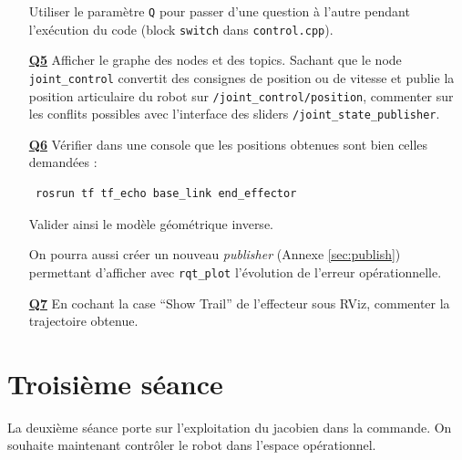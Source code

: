 \documentclass[12pt,a4paper]{article}
\begin{document}
\begin{itemize}
 Utiliser le paramètre \texttt{Q} pour passer d'une question à l'autre pendant l'exécution du code (block \texttt{switch} dans \texttt{control.cpp}).
 
  \medskip\item[\textbf{\underline{Q5}}] Afficher le graphe des nodes et des topics. Sachant que le node \texttt{joint\_control} convertit des consignes de position ou de vitesse et publie la position articulaire du robot sur \texttt{/joint\_control/position}, commenter sur les conflits possibles avec l'interface des sliders \texttt{/joint\_state\_publisher}.
 
 \medskip\item[\textbf{\underline{Q6}}]  Vérifier dans une console que les positions obtenues sont bien celles demandées :
 \begin{verbatim}
 rosrun tf tf_echo base_link end_effector
\end{verbatim}Valider ainsi le modèle géométrique inverse. 

On pourra aussi créer un nouveau \emph{publisher} (Annexe \ref{sec:publish}) permettant d'afficher avec \texttt{rqt\_plot} l'évolution de l'erreur opérationnelle.

\medskip\item[\textbf{\underline{Q7}}] En cochant la case ``Show Trail'' de l'effecteur sous RViz, commenter la trajectoire obtenue.

\end{itemize}

\newpage

\section{Troisième séance}

La deuxième séance porte sur l'exploitation du jacobien dans la commande. On souhaite maintenant contrôler le robot dans l'espace opérationnel.
\end{document}
